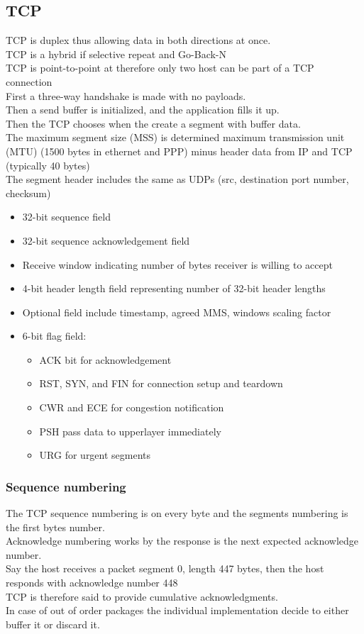 \documentclass[12pt, a4paper]{article}
\begin{document}
		\subsection{TCP}
			TCP is duplex thus allowing data in both directions at once.\\
			TCP is a hybrid if selective repeat and Go-Back-N\\
			TCP is point-to-point at therefore only two host can be part of a TCP connection\\
			First a three-way handshake is made with no payloads.\\
			Then a send buffer is initialized, and the application fills it up.\\
			Then the TCP chooses when the create a segment with buffer data.\\
			The maximum segment size (MSS) is determined maximum transmission unit (MTU) (1500 bytes in ethernet and PPP) minus header data from IP and TCP (typically 40 bytes) \\
			The segment header includes the same as UDPs (src, destination port number, checksum)
			\begin{itemize}
				\item 32-bit sequence field
				\item 32-bit sequence acknowledgement field
				\item Receive window indicating number of bytes receiver is willing to accept
				\item 4-bit header length field representing number of 32-bit header lengths
				\item Optional field include timestamp, agreed MMS, windows scaling factor 
				\item 6-bit flag field: 
				\begin{itemize}
					\item ACK bit for acknowledgement 
					\item RST, SYN, and FIN for connection setup and teardown
					\item CWR and ECE for congestion notification
					\item PSH pass data to upperlayer immediately
					\item URG for urgent segments
				\end{itemize}
			\end{itemize} 
			\subsubsection{Sequence numbering}
				The TCP sequence numbering is on every byte and the segments numbering is the first bytes number.\\
				Acknowledge numbering works by the response is the next expected acknowledge number. \\
				Say the host receives a packet segment 0, length 447 bytes, then the host responds with acknowledge number 448\\
				TCP is therefore said to provide cumulative acknowledgments.\\
				In case of out of order packages the individual implementation decide to either buffer it or discard it.
\end{document}
